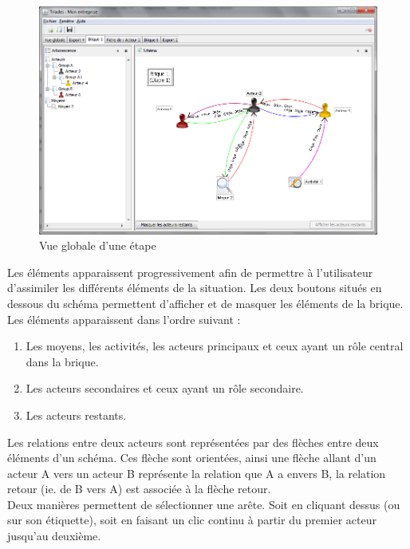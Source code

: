 \begin{figure}[h!]
\centering
\includegraphics[scale=0.55]{images/brique.png}
\caption{Vue globale d'une étape}

\label{brique}
\end{figure}

Les éléments apparaissent progressivement afin de permettre à l'utilisateur d'assimiler les différents éléments de la situation. Les deux boutons situés en dessous du schéma permettent d'afficher et de masquer les éléments de la brique.\\

Les éléments apparaissent dans l'ordre suivant :\\
\begin{enumerate}
\item Les moyens, les activités, les acteurs principaux et ceux ayant un rôle central dans la brique.
\item Les acteurs secondaires et ceux ayant un rôle secondaire.
\item Les acteurs restants.\\
\end{enumerate}

Les relations entre deux acteurs sont représentées par des flèches entre deux éléments d'un schéma. Ces flèche sont orientées, ainsi une flèche allant d'un acteur A vers un acteur B représente la relation que A a envers B, la relation retour (ie. de B vers A) est associée à la flèche retour.\\

Deux manières permettent de sélectionner une arête. Soit en cliquant dessus (ou sur son étiquette), soit en faisant un clic continu à partir du premier acteur jusqu'au deuxième.\\

